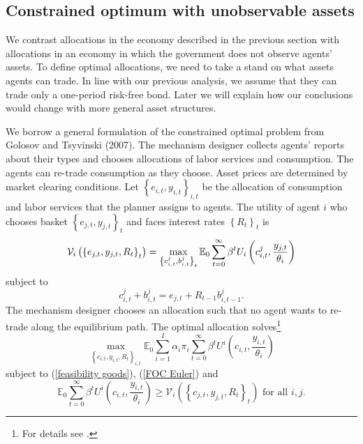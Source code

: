 \documentclass[thmsb,11pt]{article}
\begin{document}
{\smallskip

\subsection{Constrained optimum with unobservable assets\label{apndx: unobs-assets}}

We contrast allocations in the economy described in the previous section
with allocations in an economy in which the government does not observe
agents' assets. To define optimal allocations, we need to take a stand on
what assets agents can trade. In line with our previous analysis, we assume
that they can trade only a one-period risk-free bond. Later we will explain
how our conclusions would change with more general asset structures.

\smallskip We borrow a general formulation of the constrained optimal
problem from Golosov and Tsyvinski (2007). The mechanism designer collects
agents' reports about their types and chooses allocations of labor services
and consumption. The agents can re-trade consumption as they choose. Asset
prices are determined by market clearing conditions. Let $\left \{
e_{i,t},y_{i,t}\right \} _{i,t}$ be the allocation of consumption and labor
services that the planner assigns to agents. The utility of agent $i$ who
chooses basket $\left \{ e_{j,t},y_{j,t}\right \} _{t}$ and faces interest
rates $\left \{ R_{t}\right \} _{t}$ is
\begin{equation*}
\mathcal{V}_{i}\left( \left \{ e_{j,t},y_{j,t},R_{t}\right \} _{t}\right)
=\max_{\left \{ c_{i,t}^{j},b_{i,t}^{j}\right \} _{t}}\mathbb{E}%
_{0}\sum_{t=0}^{\infty }\beta ^{t}U_{i}\left( c_{i,t}^{j},\frac{y_{j,t}}{%
\theta _{i}}\right)
\end{equation*}%
subject to
\begin{equation*}
c_{i,t}^{j}+b_{i,t}^{j}=e_{j,t}+R_{t-1}b_{i,t-1}^{j}.
\end{equation*}
The mechanism designer chooses an allocation such that no agent wants to
re-trade along the equilibrium path. The optimal allocation solves\footnote{%
For details see \cite{Golosov01052007}.}
\begin{equation*}
\max_{\left \{ c_{i,t},y_{i,t},R_{t}\right \} _{i,t}}\mathbb{E}%
_{0}\sum_{i=1}^{I}\alpha _{i}\pi _{i}\sum_{t=0}^{\infty }\beta
^{t}U^{i}\left( c_{i,t},\frac{y_{i,t}}{\theta _{i}}\right)
\end{equation*}%
subject to (\ref{feasibility goods}), (\ref{FOC Euler}) and%
\begin{equation*}
\mathbb{E}_{0}\sum_{t=0}^{\infty }\beta ^{t}U^{i}\left( c_{i,t},\frac{y_{i,t}%
}{\theta _{i}}\right) \geq \mathcal{V}_{i}\left( \left \{
c_{j,t},y_{j,t},R_{t}\right \} _{t}\right) \text{ for all }i,j.
\end{equation*}

}
\end{document}
